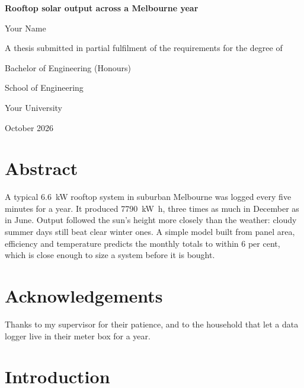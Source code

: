 \documentclass[11pt,a4paper]{report}    %
\begin{document}
\begin{titlepage}
  \centering
  \vspace*{30mm}
  {\LARGE\bfseries Rooftop solar output across a Melbourne year\par}
  \vspace{12mm}
  {\Large Your Name\par}
  \vspace{25mm}
  A thesis submitted in partial fulfilment of the requirements for the degree of\par
  \vspace{3mm}
  {\large Bachelor of Engineering (Honours)\par}
  \vfill
  School of Engineering\par
  Your University\par
  \vspace{6mm}
  October 2026
\end{titlepage}


\chapter*{Abstract}
A typical \qty{6.6}{\kilo\watt} rooftop system in suburban Melbourne was logged every five minutes for a year.
It produced \qty{7790}{\kilo\watt\hour}, three times as much in December as in June. Output
followed the sun's height more closely than the weather: cloudy summer days still beat clear
winter ones. A simple model built from panel area, efficiency and temperature predicts the
monthly totals to within 6 per cent, which is close enough to size a system before it is
bought.

\chapter*{Acknowledgements}
Thanks to my supervisor for their patience, and to the household that let a data logger live
in their meter box for a year.

\tableofcontents
\listoffigures
\listoftables

\clearpage
{}

\chapter{Introduction}\label{ch:intro}
\end{document}
